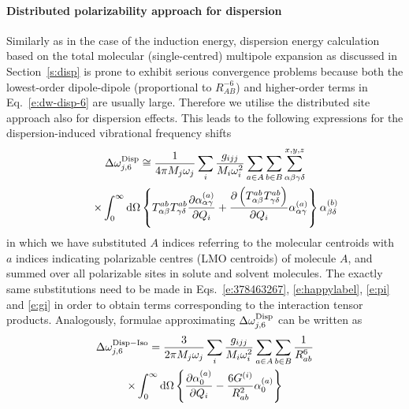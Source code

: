 \documentclass[b5paper,oneside,fleqn,11pt]{book}
\begin{document}
\begin{refsection}
\paragraph{Distributed polarizability approach for dispersion\label{s:disp-distributed}}
Similarly as in the case of the induction energy, 
dispersion energy calculation based on the total molecular (single\hyp{}centred)
multipole expansion as discussed in Section~\ref{s:disp} 
is prone to exhibit serious convergence problems because
both the lowest\hyp{}order 
dipole\hyp{}dipole (proportional to $R^{-6}_{AB}$) 
and higher\hyp{}order terms in Eq.~\eqref{e:dw-disp-6} 
are usually large. Therefore we utilise the distributed site 
approach also for dispersion effects. \citep{Adamovic.Gordon.MolPhys.2005}
This leads to the following expressions for the 
dispersion\hyp{}induced vibrational frequency shifts 
%
\begin{multline} \label{e:dw-disp-6-distr-working}
    \Delta\omega_{j,6}^{\rm Disp} \cong 
       \frac{1}{4\pi M_j\omega_j}\sum_i \frac{g_{ijj}}{M_i\omega_i^2} 
       \sum_{a\in  A}\sum_{b\in B}
       \sum_{\alpha\beta\gamma\delta}^{x,y,z}  \\ 
    \qquad \times \int_{0}^{\infty} {\rm d}\Omega
       \left\{
         T^{ab}_{\alpha\beta}T^{ab}_{\gamma\delta}
           \frac{\partial \alpha_{\alpha\gamma}^{(a)}}{\partial Q_i}
            +
           \frac{\partial \left(T^{ab}_{\alpha\beta}T^{ab}_{\gamma\delta}\right)}{\partial Q_i}
          \alpha_{\alpha\gamma}^{(a)}
      \right\}
      \alpha_{\beta\delta}^{(b)}   
\end{multline}
%
in which we have substituted $A$ indices referring to the molecular centroids
with $a$ indices indicating polarizable centres (LMO centroids) 
of molecule $A$, and summed over all polarizable sites in solute
and solvent molecules. The exactly same substitutions need to be made
in Eqs.~\eqref{e:378463267}, \eqref{e:happylabel}, \eqref{e:pi}  and \eqref{e:gi}
in order to obtain terms corresponding to the interaction tensor products.
Analogously, formulae approximating $\Delta\omega_{j,6}^{\rm Disp}$ 
can be written as
%
\begin{multline} \label{e:dw-disp-6-iso-distributed}
\Delta \omega_{j,6}^{\rm Disp-Iso} = \frac{3}{2\pi M_j\omega_j}
\sum_i \frac{g_{ijj}}{M_i\omega_i^2} 
\sum_{a\in  A}\sum_{b\in B}
\frac{1}{R^6_{ab}} \\ \times
\int_{0}^{\infty} {\rm d}\Omega \left\{ 
\frac{\partial \alpha_0^{(a)}}{\partial Q_i}- 
\frac{6G^{(i)}}{R^2_{ab}} 
\alpha_0^{(a)}
\right\}

\end{multline}
\end{refsection}
\end{document}
